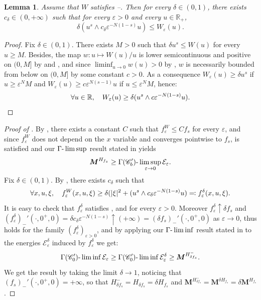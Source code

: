 \documentclass[JEP,XML,SOM,Unicode,published]{cedram}
\theoremstyle{plain}
\newtheorem{lemma}[theorem]{Lemma}
\theoremstyle{definition}
\newcommand{\R}{\mathbb{R}}
\newcommand{\Cspace}{\mathscr{C}}
\newcommand{\ener}{\mathcal{E}}
\newcommand{\mass}{\boldsymbol{M}}
\newcommand{\eps}{\varepsilon}
\DeclarePairedDelimiter{\abs}{\lvert}{\rvert}
\begin{document}
\begin{lemma}\label{lemmaW}
Assume that $W$ satisfies --. Then for every $\delta \in (0,1)$, there exists $c_\delta \in (0,+\infty)$ such that for every $\eps > 0$ and every $u \in \R_+$,
\begin{equation}
\delta ( u^s \wedge c_\delta \eps^{-N(1-s)} u) \leq W_\eps(u).
\end{equation}
\end{lemma}
\begin{proof}
Fix $\delta \in (0,1)$. There exists $M > 0$ such that $\delta u^s \leq W(u)$ for every $u \geq M$. Besides, the map $w : u \mapsto W(u)/u$ is lower semicontinuous and positive on $(0,M]$ by  and , and since $\liminf_{u\to 0} w(u) > 0$ by , $w$ is necessarily bounded from below on $(0,M]$ by some constant $c > 0$. As a consequence $W_\eps(u) \geq \delta u^s$ if $u\geq \eps^N M$ and $W_\eps(u) \geq c \eps^{N(s-1)}u$ if $u\leq \eps^N M$, hence:
\[\forall u\in \R, \quad W_\eps(u) \geq \delta ( u^s \wedge c \eps^{-N(1-s)} u).\qedhere\]
\end{proof}

\begin{proof}[Proof of ]
By , there exists a constant $C$ such that $f_\eps^W \leq C f_s$ for every $\eps$, and since $f_\eps^W$ does not depend on the $x$ variable and converges pointwise to $f_s$,  is satisfied and our $\Gamma\textup{-}\limsup$ result stated in  yields
\[\mass^{H_{f_s}} \geq \Gamma(\Cspace_b')\textup{-}\limsup_{\eps \to 0} \ener_\eps.\]
Fix $\delta \in (0,1)$. By , there exists $c_\delta$ such that
\[\forall x,u,\xi, \quad f_\eps^W(x,u,\xi) \geq \delta(\abs{\xi}^2 + (u^s \wedge c_\delta \eps^{-N(1-s)} u) \eqqcolon f_\eps^\delta(x,u,\xi).\]
It is easy to check that $f^\delta_\eps$ satisfies ,  and  for every $\eps > 0$. Moreover $f_\eps^\delta \uparrow \delta f_s$ and $(f_{\eps}^\delta)_-'(\cdot,0^+,0) = \delta c_\delta \eps^{-N(1-s)} \uparrow (+\infty) = (\delta f_s)_-'(\cdot,0^+,0)$ as $\eps \to 0$, thus  holds for the family $(f_\eps^\delta)_{\eps > 0}$, and by applying our $\Gamma\textup{-}\liminf$ result stated in  to the energies $\ener_\eps^\delta$ induced by $f_\eps^\delta$ we get:
\[\Gamma(\Cspace_0')\textup{-}\liminf \ener_\eps \geq \Gamma(\Cspace_0')\textup{-}\liminf \ener_\eps^\delta \geq \mass^{H_{\delta f_s}^-}.\]
We get the result by taking the limit $\delta \to 1$, noticing that $(f_s)_-'(\cdot,0^+,0) = +\infty$, so that $H_{\delta f_s}^- = H_{\delta f_s} = \delta H_{f_s}$ and $\mass^{H_{\delta f_s}^-} = \mass^{\delta H_{f_s}} = \delta \mass^{H_{f_s}}$.
\end{proof}
\end{document}
